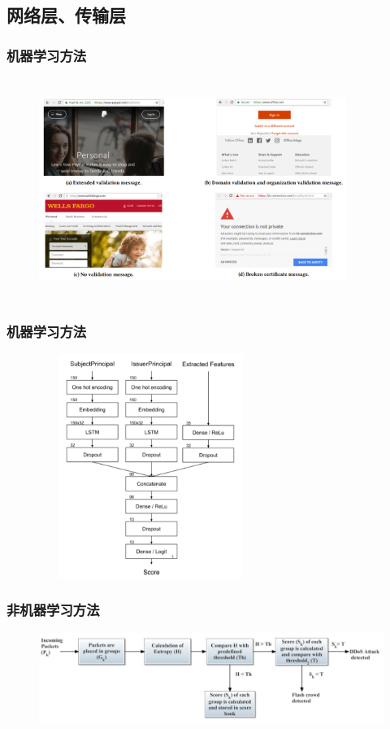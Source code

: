 \documentclass[12pt]{ctexbeamer}
\begin{document}
\subsection{网络层、传输层}
\begin{frame}
  \frametitle{机器学习方法}
  \begin{figure}
    \includegraphics[width=10cm, height = 7.2cm]{figures/tls_cert.PNG}
  	\end{figure}


\end{frame}

\begin{frame}
  \frametitle{机器学习方法}
  \begin{figure}
    \includegraphics[width=7.3cm,height = 7.3cm]{figures/tls_block.PNG}
  	\end{figure}
 

\end{frame}

\begin{frame}
  \frametitle{非机器学习方法}
  \begin{figure}
    \includegraphics[width=1.1\textwidth]{figures/entropy.PNG}
  	\end{figure}


\end{frame}
\end{document}
